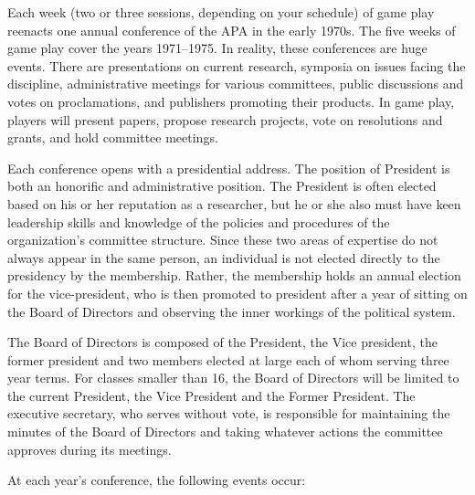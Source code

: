 Each week (two or three sessions, depending on your schedule) of game play reenacts one annual conference of the APA in the early 1970s. The five weeks of game play cover the years 1971--1975. In reality, these conferences are huge events. There are presentations on current research, symposia on issues facing the discipline, administrative meetings for various committees, public discussions and votes on proclamations, and publishers promoting their products. In game play, players will present papers, propose research projects, vote on resolutions and grants, and hold committee meetings.

Each conference opens with a presidential address. The position of President is both an honorific and administrative position. The President is often elected based on his or her reputation as a researcher, but he or she also must have keen leadership skills and knowledge of the policies and procedures of the organization's committee structure. Since these two areas of expertise do not always appear in the same person, an individual is not elected directly to the presidency by the membership. Rather, the membership holds an annual election for the vice-president, who is then promoted to president after a year of sitting on the Board of Directors and observing the inner workings of the political system.

The Board of Directors is composed of the President, the Vice president, the former president and two members elected at large each of whom serving three year terms. For classes smaller than 16, the Board of Directors will be limited to the current President, the Vice President and the Former President. The executive secretary, who serves without vote, is responsible for maintaining the minutes of the Board of Directors and taking whatever actions the committee approves during its meetings.

At each year's conference, the following events occur:

